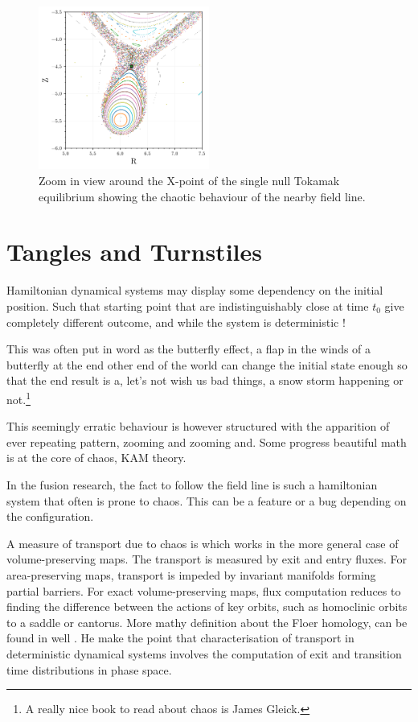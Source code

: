 \begin{figure}
    \centering
    \includegraphics[width=0.5\textwidth]{images/toytok/perturbed-6-1/perturbed_6_1_closer.png}
    \caption{Zoom in view around the X-point of the single null Tokamak equilibrium showing the chaotic behaviour of the nearby field line.}
    \label{fig:xpoint-chaos}
\end{figure}

\chapter{Tangles and Turnstiles}\label{ch:tangleandturns}

Hamiltonian dynamical systems may display some dependency on the initial position. Such that starting point that are indistinguishably close at time $t_0$ give completely different outcome, and while the system is deterministic !

This was often put in word as the butterfly effect, a flap in the winds of a butterfly at the end other end of the world can change the initial state enough so that the end result is a, let's not wish us bad things, a snow storm happening or not.\footnote{A really nice book to read about chaos is James Gleick.}

This seemingly erratic behaviour is however structured with the apparition of ever repeating pattern, zooming and zooming and. Some progress beautiful math is at the core of chaos, KAM theory.

In the fusion research, the fact to follow the field line is such a hamiltonian \cite{escande_description_2024}\cite{abdullaev_magnetic_2014}\cite{viana_hamiltonian_2023} system that often is prone to chaos. This can be a feature or a bug depending on the configuration. 

A measure of transport due to chaos is \cite{meiss_thirty_2015} which works in the more general case of volume-preserving maps. The transport is measured by exit and entry fluxes. For area-preserving maps, transport is impeded by invariant manifolds forming partial barriers. For exact volume-preserving maps, flux computation reduces to finding the difference between the actions of key orbits, such as homoclinic orbits to a saddle or cantorus. More mathy definition about the Floer homology, can be found in well \cite{hohloch_transport_2012}\cite{hohloch_homoclinic_2017}. He make the point that  characterisation of transport in deterministic dynamical systems involves the computation of exit and transition time distributions in phase space. 

